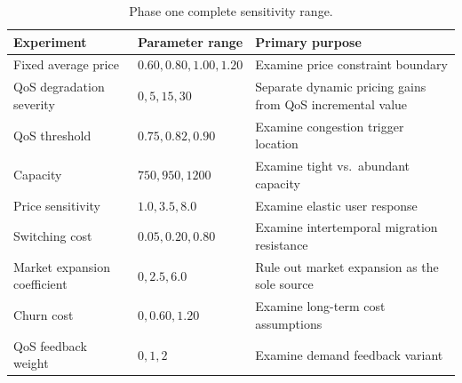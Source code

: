 \documentclass[11pt]{article}
\begin{document}
\begin{table}[H]
\centering
\caption{Phase one complete sensitivity range.}
\label{tab:full_sensitivity}
\begin{tabular}{lll}
\toprule
Experiment & Parameter range & Primary purpose \\
\midrule
Fixed average price & $0.60,0.80,1.00,1.20$ & Examine price constraint boundary \\
QoS degradation severity & $0,5,15,30$ & Separate dynamic pricing gains from QoS incremental value \\
QoS threshold & $0.75,0.82,0.90$ & Examine congestion trigger location \\
Capacity & $750,950,1200$ & Examine tight vs.\ abundant capacity \\
Price sensitivity & $1.0,3.5,8.0$ & Examine elastic user response \\
Switching cost & $0.05,0.20,0.80$ & Examine intertemporal migration resistance \\
Market expansion coefficient & $0,2.5,6.0$ & Rule out market expansion as the sole source \\
Churn cost & $0,0.60,1.20$ & Examine long-term cost assumptions \\
QoS feedback weight & $0,1,2$ & Examine demand feedback variant \\
\bottomrule
\end{tabular}
\end{table}

\small


\end{document}
